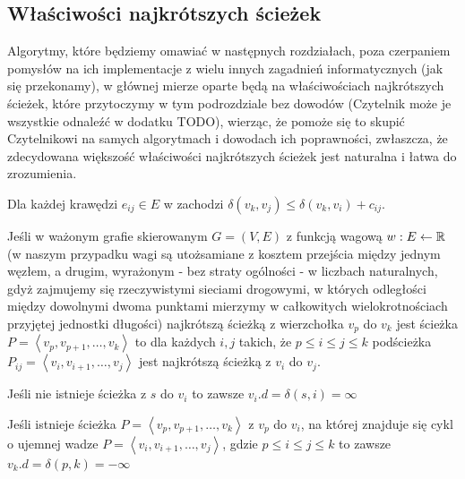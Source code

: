 \subsection{Właściwości najkrótszych ścieżek}
\label{sub:shortestPathProperties}

Algorytmy, które będziemy omawiać w następnych rozdziałach, poza czerpaniem pomysłów na ich implementacje z wielu innych zagadnień informatycznych (jak się przekonamy), w głównej mierze oparte będą na właściwościach najkrótszych ścieżek, które przytoczymy w tym podrozdziale bez dowodów (Czytelnik może je wszystkie odnaleźć w dodatku TODO), wierząc, że pomoże się to skupić Czytelnikowi na samych algorytmach i dowodach ich poprawności, zwłaszcza, że zdecydowana większość właściwości najkrótszych ścieżek jest naturalna i łatwa do zrozumienia.

\begin{lemma}\label{lem:triangleInequality}
Dla każdej krawędzi $e_{ij} \in E$ w zachodzi $ \delta \left( v_{k}, v_{j} \right) \leqslant \delta \left( v_{k}, v_{i} \right) + c_{ij}$.
\end{lemma}

\begin{lemma}\label{lem:optimalSubstructure}
Jeśli w ważonym grafie skierowanym $ G = \left( V, E \right)$ z funkcją wagową $w: E \leftarrow \mathbb{R}$ (w naszym przypadku wagi są utożsamiane z kosztem przejścia między jednym węzłem, a drugim, wyrażonym - bez straty ogólności - w liczbach naturalnych, gdyż zajmujemy się rzeczywistymi sieciami drogowymi, w których odległości między dowolnymi dwoma punktami mierzymy w całkowitych wielokrotnościach przyjętej jednostki długości) najkrótszą ścieżką z wierzchołka $v_{p}$ do $v_{k}$ jest ścieżka $P = \left \langle v_{p}, v_{p+1}, \ldots, v_{k} \right \rangle $ to dla każdych $i,j$ takich, że $p \leqslant i \leqslant j \leqslant k$ podścieżka $P_{ij} = \left \langle v_{i}, v_{i+1}, \ldots, v_{j} \right \rangle $ jest najkrótszą ścieżką z $v_{i}$ do $v_{j}$.
\end{lemma}

\begin{lemma}\label{lem:noPath}
Jeśli nie istnieje ścieżka z $s$ do $v_{i}$ to zawsze $v_{i}.d = \delta \left( s, i \right) = \infty$
\end{lemma}

\begin{lemma}\label{lem:pathWithNegativeCycle}
Jeśli istnieje ścieżka $P = \left \langle v_{p}, v_{p+1}, \ldots, v_{k} \right \rangle $ z $v_{p}$ do $v_{i}$, na której znajduje się cykl o ujemnej wadze $P = \left \langle v_{i}, v_{i+1}, \ldots, v_{j} \right \rangle $, gdzie $p \leqslant i \leqslant j \leqslant k$ to zawsze $v_{k}.d = \delta \left( p, k \right) = - \infty$
\end{lemma}

